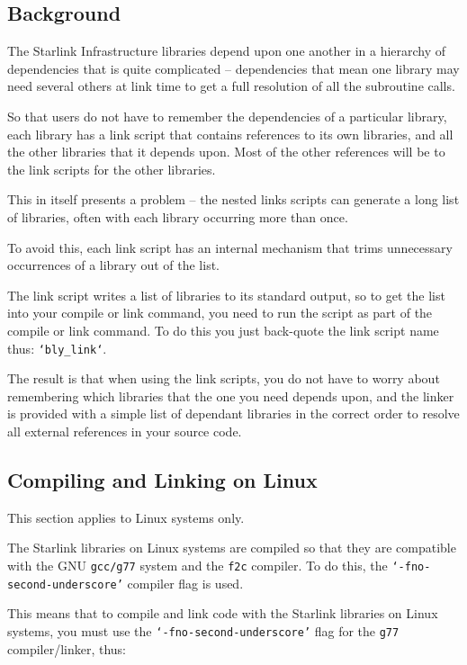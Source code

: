 \documentclass[twoside,11pt]{article}
\newcommand{\xlabel}[1]{}
\begin{document}
\subsection{\xlabel{link_scripts_background}Background}
\label{link_scripts_background}

The Starlink Infrastructure libraries depend upon one another in a
hierarchy of dependencies that is quite complicated -- dependencies that
mean one library may need several others at link time to get a full
resolution of all the subroutine calls. 

So that users do not have to remember the dependencies of a particular
library, each library has a link script that contains references
to its own libraries, and all the other libraries that it depends upon.  
Most of the other references will be to the link scripts for the other
libraries.

This in itself presents a problem -- the nested links scripts can 
generate a long list of libraries, often with each library occurring more 
than once.  

To avoid this, each link script has an internal mechanism that trims 
unnecessary occurrences of a library out of the list.

The link script writes a list of libraries to its standard output, so
to get the list into your compile or link command, you need to run the
script as part of the compile or link command.  To do this you just
back-quote the link script name thus: \texttt{`bly\_link`}.

The result is that when using the link scripts, you do not have to worry 
about remembering which libraries that the one you need depends upon, and 
the linker is provided with a simple list of dependant libraries in the 
correct order to resolve all external references in your source code.

\subsection{\xlabel{compiling_and_linking_on_liunux}Compiling and Linking on Linux}
\label{compiling_and_linking_on_liunux}

This section applies to Linux systems only.

The Starlink libraries on Linux systems are compiled so that they are
compatible with the GNU \texttt{gcc/g77} system and the \texttt{f2c}
compiler.  To do this, the \texttt{`-fno-second-underscore'} compiler
flag is used.

This means that to compile and link code with the Starlink libraries
on Linux systems, you must use the \texttt{`-fno-second-underscore'}
flag for the \texttt{g77} compiler/linker, thus:
\end{document}

